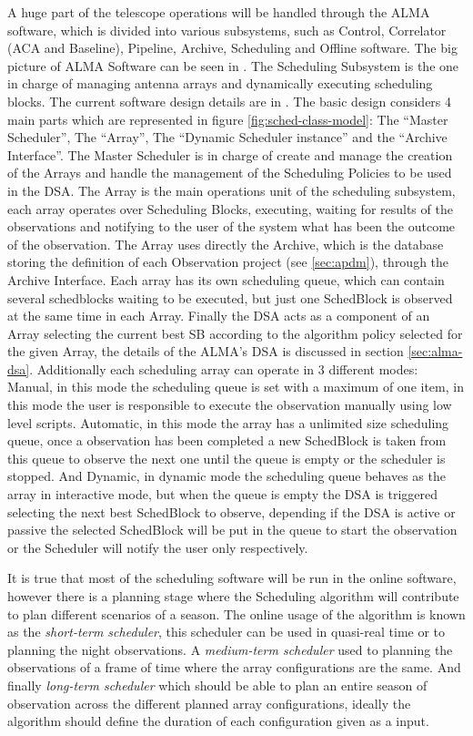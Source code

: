 \documentclass[11pt]{article}
\begin{document}
A huge part of the telescope operations will be handled through the ALMA software, which is divided into various subsystems, such as Control, Correlator (ACA and Baseline), Pipeline, Archive, Scheduling and Offline software. The big picture of ALMA Software can be seen in \cite{schwarz04}.
The Scheduling Subsystem is the one in charge of managing antenna arrays and dynamically executing scheduling blocks. The current software design details are in \cite{clarke12}. The basic design considers 4 main parts which are represented in figure \ref{fig:sched-class-model}: The ``Master Scheduler'', The ``Array'', The ``Dynamic Scheduler instance'' and the ``Archive Interface''. The Master Scheduler is in charge of create and manage the creation of the Arrays and handle the management of the Scheduling Policies to be used in the DSA. The Array is the main operations unit of the scheduling subsystem, each array operates over Scheduling Blocks, executing, waiting for results of the observations and notifying to the user of the system what has been the outcome of the observation. The Array uses directly the Archive, which is the database storing the definition of each Observation project (see \ref{sec:apdm}), through the Archive Interface. Each array has its own scheduling queue, which can contain several schedblocks waiting to be executed, but just one SchedBlock is observed at the same time in each Array. Finally the DSA acts as a component of an Array selecting the current best SB according to the algorithm policy selected for the given Array, the details of the ALMA's DSA is discussed in section \ref{sec:alma-dsa}. Additionally each scheduling array can operate in 3 different modes: Manual, in this mode the scheduling queue is set with a maximum of one item, in this mode the user is responsible to execute the observation manually using low level scripts. Automatic, in this mode the array has a unlimited size scheduling queue, once a observation has been completed a new SchedBlock is taken from this queue to observe the next one until the queue is empty or the scheduler is stopped. And Dynamic, in dynamic mode the scheduling queue behaves as the array in interactive mode, but when the queue is empty the DSA is triggered selecting the next best SchedBlock to observe, depending if the DSA is active or passive the selected SchedBlock will be put in the queue to start the observation or the Scheduler will notify the user only respectively.

It is true that most of the scheduling software will be run in the online software, however there is a planning stage where the Scheduling algorithm will contribute to plan different scenarios of a season. The online usage of the algorithm is known as the \textit{short-term scheduler}, this scheduler can be used in quasi-real time or to planning the night observations. A \textit{medium-term scheduler} used to planning the observations of a frame of time where the array configurations are the same. And finally \textit{long-term scheduler} which should be able to plan an entire season of observation across the different planned array configurations, ideally the algorithm should define the duration of each configuration given as a input.  
\end{document}
